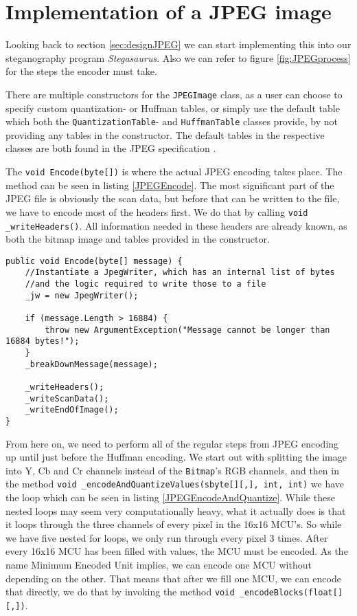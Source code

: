 \section{Implementation of a JPEG image}
Looking back to section \ref{sec:designJPEG} we can start implementing this into our steganography program \textit{Stegasaurus}.
Also we can refer to figure \ref{fig:JPEGprocess} for the steps the encoder must take.

There are multiple constructors for the \lstinline|JPEGImage| class, as a user can choose to specify custom quantization- or Huffman tables, or simply use the default table which both the \lstinline|QuantizationTable|- and \lstinline|HuffmanTable| classes provide, by not providing any tables in the constructor.
The default tables in the respective classes are both found in the JPEG specification \citep[Annex k]{JPEGStandard}.

The \lstinline|void Encode(byte[])| is where the actual JPEG encoding takes place.
The method can be seen in listing \ref{JPEGEncode}.
The most significant part of the JPEG file is obviously the scan data, but before that can be written to the file, we have to encode most of the headers first.
We do that by calling \lstinline|void _writeHeaders()|.
All information needed in these headers are already known, as both the bitmap image and tables provided in the constructor.

\begin{lstlisting}[firstnumber=136,label=JPEGEncode]
public void Encode(byte[] message) {
    //Instantiate a JpegWriter, which has an internal list of bytes 
    //and the logic required to write those to a file
    _jw = new JpegWriter();

    if (message.Length > 16884) {
        throw new ArgumentException("Message cannot be longer than 16884 bytes!");
    }
    _breakDownMessage(message);

    _writeHeaders();
    _writeScanData();
    _writeEndOfImage();
}
\end{lstlisting}

From here on, we need to perform all of the regular steps from JPEG encoding up until just before the Huffman encoding.
We start out with splitting the image into Y, Cb and Cr channels instead of the \lstinline|Bitmap|'s RGB channels, and then in the method \lstinline|void _encodeAndQuantizeValues(sbyte[][,], int, int)| we have the loop which can be seen in listing \ref{JPEGEncodeAndQuantize}.
While these nested loops may seem very computationally heavy, what it actually does is that it loops through the three channels of every pixel in the 16x16 MCU's.
So while we have five nested for loops, we only run through every pixel 3 times.
After every 16x16 MCU has been filled with values, the MCU must be encoded.
As the name Minimum Encoded Unit implies, we can encode one MCU without depending on the other.
That means that after we fill one MCU, we can encode that directly, we do that by invoking the method \lstinline|void _encodeBlocks(float[][,])|.

